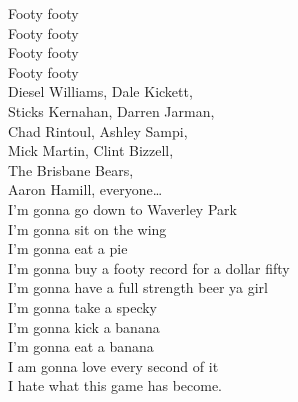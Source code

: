 Footy footy\\
Footy footy\\
Footy footy\\
Footy footy\\

Diesel Williams, Dale Kickett,\\
Sticks Kernahan, Darren Jarman,\\
Chad Rintoul, Ashley Sampi,\\
Mick Martin, Clint Bizzell,\\
The Brisbane Bears,\\
Aaron Hamill, everyone…\\

I'm gonna go down to Waverley Park\\
I'm gonna sit on the wing\\
I'm gonna eat a pie\\
I'm gonna buy a footy record for a dollar fifty\\
I'm gonna have a full strength beer ya girl\\
I'm gonna take a specky\\
I'm gonna kick a banana\\
I'm gonna eat a banana\\
I am gonna love every second of it\\
I hate what this game has become.\\
